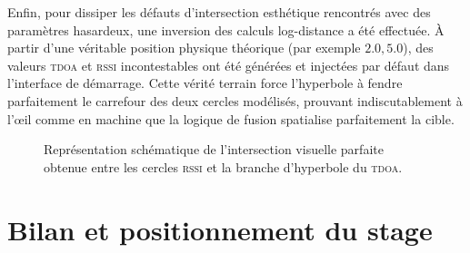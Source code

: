 \documentclass[12pt, a4paper]{article}
\newcommand{\TDOA}{\textsc{tdoa}}
\newcommand{\RSSI}{\textsc{rssi}}
\begin{document}
Enfin, pour dissiper les défauts d'intersection esthétique rencontrés avec des paramètres hasardeux, une inversion des calculs log-distance a été effectuée. À partir d'une véritable position physique théorique (par exemple $2.0, 5.0$), des valeurs \TDOA{} et \RSSI{} incontestables ont été générées et injectées par défaut dans l'interface de démarrage. Cette \og{}vérité terrain\fg{} force l'hyperbole à fendre parfaitement le carrefour des deux cercles modélisés, prouvant indiscutablement à l'œil comme en machine que la logique de fusion spatialise parfaitement la cible.

\vspace{0.5cm}
\begin{figure}[h!]
  \centering
  \caption{Représentation schématique de l'intersection visuelle parfaite obtenue entre les cercles \RSSI{} et la branche d'hyperbole du \TDOA{}.}
  \label{fig:intersection}
\end{figure}
\vspace{0.5cm}

\section{Bilan et positionnement du stage}
\end{document}
